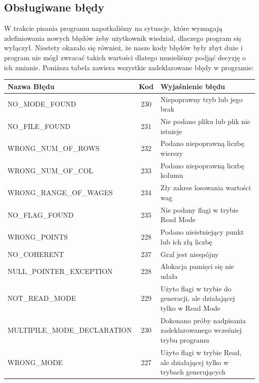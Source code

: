 \documentclass[10pt, a4paper]{report}
\begin{document}
    \subsection{Obsługiwane błędy}
    W trakcie pisania programu napotkaliśmy na sytuacje, które wymagają zdefiniowania nowych błędów żeby użytkownik wiedział, dlaczego program się wyłączył.
    Niestety okazało się również, że nasze kody błędów były zbyt duże i program nie mógł zwracać takich wartości dlatego musieliśmy podjąć decyzję o ich zmianie.
    \newline Poniższa tabela zawiera wszystkie zadeklarowane błędy w programie:
    \newline
    \begin{tabularx}{\textwidth}{ l|c|X } 
        \hline Nazwa Błędu & Kod & Wyjaśnienie błędu\\ 
        \hline NO\_MODE\_FOUND & 230 & Niepoprawny tryb lub jego brak\\ 
        \hline NO\_FILE\_FOUND & 231 & Nie podano pliku lub plik nie istnieje\\ 
        \hline WRONG\_NUM\_OF\_ROWS & 232 & Podano niepoprawną liczbę wierszy\\
        \hline WRONG\_NUM\_OF\_COL & 233 & Podano niepoprawną liczbę kolumn\\
        \hline WRONG\_RANGE\_OF\_WAGES & 234 & Zły zakres losowania wartości wag\\
        \hline NO\_FLAG\_FOUND & 235 & Nie podany flagi w trybie Read Mode\\
        \hline WRONG\_POINTS & 228 & Podano nieistniejący punkt lub ich złą liczbę\\
        \hline NO\_COHERENT & 237 & Graf jest niespójny \\
        \hline NULL\_POINTER\_EXCEPTION & 228 & Alokacja pamięci się nie udała\\
        \hline NOT\_READ\_MODE & 229 & Użyto flagi w trybie do generacji, ale działającej tylko w Read Mode\\
        \hline MULTIPILE\_MODE\_DECLARATION & 230 & Dokonano próby nadpisania zadeklarowanego wcześniej trybu programu\\
        \hline WRONG\_MODE & 227 & Użyto flagi w trybie Read, ale działającej tylko w trybach generujących\\
        \hline
    \end{tabularx}
\end{document}

